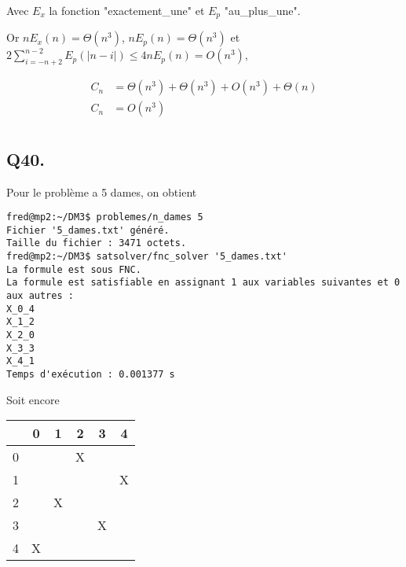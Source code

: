     Avec $E_x$ la fonction "exactement\_une" et $E_p$ "au\_plus\_une".
    
    Or $nE_x(n) = \Theta(n^3)$, $nE_p(n) = \Theta(n^3)$ et
    $2\sum_{i=-n+2}^{n-2}E_p(|n-i|) \leq 4nE_p(n) = O(n^3)$,
    
    \begin{align*}
        C_n &= \Theta(n^3) + \Theta(n^3) + O(n^3) +\Theta(n)\\
        C_n &= \boxed{O(n^3)}\\
    \end{align*}
    
    \subsection*{Q40.}
    Pour le problème a 5 dames, on obtient
    \begin{lstlisting}
fred@mp2:~/DM3$ problemes/n_dames 5
Fichier '5_dames.txt' généré.
Taille du fichier : 3471 octets.
fred@mp2:~/DM3$ satsolver/fnc_solver '5_dames.txt'
La formule est sous FNC.
La formule est satisfiable en assignant 1 aux variables suivantes et 0 aux autres :
X_0_4
X_1_2
X_2_0
X_3_3
X_4_1
Temps d'exécution : 0.001377 s
    \end{lstlisting}
    Soit encore
    \begin{center}
        \begin{tabular}{| c || *{5}{c |}}
        \hline
          & 0 & 1 & 2 & 3 & 4 \\
        \hline
        \hline
        0 &   &   & X &   &   \\
        \hline
        1 &   &   &   &   & X \\
        \hline
        2 &   & X &   &   &   \\
        \hline
        3 &   &   &   & X &   \\
        \hline
        4 & X &   &   &   &   \\
        \hline
        \end{tabular}
    \end{center}
    
